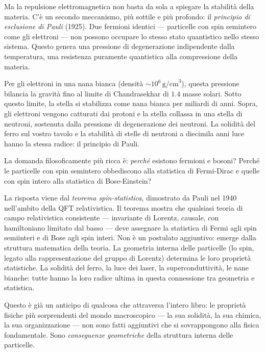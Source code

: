 \documentclass[12pt,a4paper,openany]{book}
\newcommand{\sezione}[1]{\vspace{1.2em}{\large\bfseries #1}\vspace{0.5em}\par}
\begin{document}
Ma la repulsione elettromagnetica non basta da sola a spiegare la stabilità della materia. C'è un secondo meccanismo, più sottile e più profondo: il \textit{principio di esclusione di Pauli} (1925). Due fermioni identici — particelle con spin semintero come gli elettroni — non possono occupare lo stesso stato quantistico nello stesso sistema. Questo genera una pressione di degenerazione indipendente dalla temperatura, una resistenza puramente quantistica alla compressione della materia.

Per gli elettroni in una nana bianca (densità $\sim 10^6\,\mathrm{g/cm}^3$), questa pressione bilancia la gravità fino al limite di Chandrasekhar di $1.4$ masse solari. Sotto questo limite, la stella si stabilizza come nana bianca per miliardi di anni. Sopra, gli elettroni vengono catturati dai protoni e la stella collassa in una stella di neutroni, sostenuta dalla pressione di degenerazione dei neutroni. La solidità del ferro sul vostro tavolo e la stabilità di stelle di neutroni a diecimila anni luce hanno la stessa radice: il principio di Pauli.

\sezione{Il teorema spin-statistica: la connessione più profonda}

La domanda filosoficamente più ricca è: \textit{perché} esistono fermioni e bosoni? Perché le particelle con spin semintero obbediscono alla statistica di Fermi-Dirac e quelle con spin intero alla statistica di Bose-Einstein?

La risposta viene dal \textit{teorema spin-statistica}, dimostrato da Pauli nel 1940 nell'ambito della QFT relativistica. Il teorema mostra che qualsiasi teoria di campo relativistica consistente — invariante di Lorentz, causale, con hamiltoniano limitato dal basso — deve assegnare la statistica di Fermi agli spin semiinteri e di Bose agli spin interi. Non è un postulato aggiuntivo: emerge dalla struttura matematica della teoria. La geometria interna delle particelle (lo spin, legato alla rappresentazione del gruppo di Lorentz) determina le loro proprietà statistiche. La solidità del ferro, la luce dei laser, la superconduttività, le nane bianche: tutte hanno la loro radice ultima in questa connessione tra geometria e statistica.

Questo è già un anticipo di qualcosa che attraversa l'intero libro: le proprietà fisiche più sorprendenti del mondo macroscopico — la sua solidità, la sua chimica, la sua organizzazione — non sono fatti aggiuntivi che si sovrappongono alla fisica fondamentale. Sono \textit{conseguenze geometriche} della struttura interna delle particelle.
\end{document}
